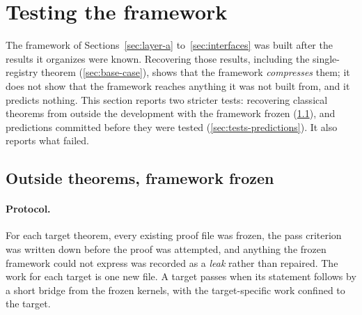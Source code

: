 
\section{Testing the framework}\label{sec:tests}

The framework of Sections~\ref{sec:layer-a} to~\ref{sec:interfaces} was built after the results it organizes were known. Recovering
those results, including the single-registry theorem (\cref{sec:base-case}), shows that the framework
\emph{compresses} them; it does not show that the framework reaches anything it was not built from,
and it predicts nothing. This section reports two stricter tests: recovering classical theorems from
outside the development with the framework frozen (\cref{sec:tests-outside}), and predictions
committed before they were tested (\cref{sec:tests-predictions}). It also reports what failed.

\subsection{Outside theorems, framework frozen}\label{sec:tests-outside}

\paragraph{Protocol.}
For each target theorem, every existing proof file was frozen, the pass criterion was written down
before the proof was attempted, and anything the frozen framework could not express was recorded as
a \emph{leak} rather than repaired. The work for each target is one new file. A target passes when its
statement follows by a short bridge from the frozen kernels, with the target-specific work confined
to the target.


